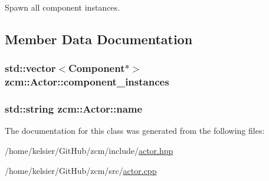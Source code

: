 Spawn all component instances. 



\subsection{Member Data Documentation}
\hypertarget{classzcm_1_1Actor_abb7a2cdfc286c8821ac6f9ad3da40a49}{
\subsubsection[{component\-\_\-instances}]{\setlength{\rightskip}{0pt plus 5cm}std\-::vector$<${\bf Component}$\ast$$>$ zcm\-::\-Actor\-::component\-\_\-instances\hspace{0.3cm}{\ttfamily [private]}}}\label{classzcm_1_1Actor_abb7a2cdfc286c8821ac6f9ad3da40a49}
\hypertarget{classzcm_1_1Actor_a2b0816bbe28c8f96fa882b625be004ee}{
\subsubsection[{name}]{\setlength{\rightskip}{0pt plus 5cm}std\-::string zcm\-::\-Actor\-::name\hspace{0.3cm}{\ttfamily [private]}}}\label{classzcm_1_1Actor_a2b0816bbe28c8f96fa882b625be004ee}


The documentation for this class was generated from the following files\-:\begin{DoxyCompactItemize}
\item 
/home/kelsier/\-Git\-Hub/zcm/include/\hyperlink{actor_8hpp}{actor.\-hpp}\item 
/home/kelsier/\-Git\-Hub/zcm/src/\hyperlink{actor_8cpp}{actor.\-cpp}\end{DoxyCompactItemize}
